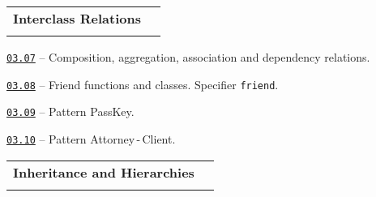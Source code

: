 \documentclass[a4paper,12pt]{article}
\renewenvironment{itemize}
{
    \begin{list}{\labelitemi}
    {
      \setlength{\topsep}{0pt}
      \setlength{\partopsep}{0pt}
      \setlength{\parskip}{0pt}
      \setlength{\itemsep}{0pt}
      \setlength{\parsep}{0pt}
      \setlength{\leftmargin}{14.5pt}
    }
}{\end{list}}
\begin{document}
\bigskip\medskip

\begin{tabular}{!{\vrule width 1pt}L{3.8cm}!{\vrule width 1pt}L{15.2cm}!{\vrule width 0pt}} 


\textbf{Interclass Relations} & \\


\end{tabular}

\medskip\smallskip

\begin{itemize}

    \item \href{https://github.com/i-s-m-mipt/Education/blob/master/projects/examples/source/03.07.cpp}{\texttt{03.07}} -- Composition, aggregation, association and dependency relations.

    \smallskip

    \item \href{https://github.com/i-s-m-mipt/Education/blob/master/projects/examples/source/03.08.cpp}{\texttt{03.08}} -- Friend functions and classes. Specifier \lstinline{friend}.

    \smallskip

    \item \href{https://github.com/i-s-m-mipt/Education/blob/master/projects/examples/source/03.09.cpp}{\texttt{03.09}} -- Pattern PassKey.

    \smallskip

    \item \href{https://github.com/i-s-m-mipt/Education/blob/master/projects/examples/source/03.10.cpp}{\texttt{03.10}} -- Pattern Attorney\,-\,Client.

\end{itemize}

\bigskip\medskip

\begin{tabular}{!{\vrule width 1pt}L{5.4cm}!{\vrule width 1pt}L{13.6cm}!{\vrule width 0pt}} 


\textbf{Inheritance and Hierarchies} & \\


\end{tabular}

\medskip\smallskip
\end{document}
